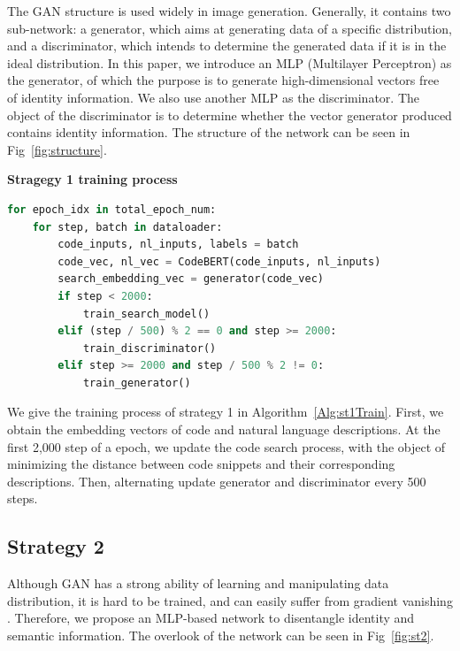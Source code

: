 The GAN structure is used widely in image generation. 
Generally, it contains two sub-network: a generator, 
which aims at generating data of a specific distribution, and a discriminator, 
which intends to determine the generated data if it is in the ideal distribution. 
In this paper, we introduce an MLP (Multilayer Perceptron) as the generator, 
of which the purpose is to generate high-dimensional vectors free of identity information. 
We also use another MLP as the discriminator. 
The object of the discriminator is to determine whether the vector generator produced 
contains identity information. The structure of the network can be seen in Fig~\ref{fig:structure}.

\begin{algorithm}[htb]
	\caption{\textbf{Stragegy 1 training process}}
	\label{Alg:st1Train}

	\begin{lstlisting}[language=Python]
for epoch_idx in total_epoch_num:
	for step, batch in dataloader:
		code_inputs, nl_inputs, labels = batch
		code_vec, nl_vec = CodeBERT(code_inputs, nl_inputs)
		search_embedding_vec = generator(code_vec)
		if step < 2000:
			train_search_model()
		elif (step / 500) % 2 == 0 and step >= 2000:         
			train_discriminator()
		elif step >= 2000 and step / 500 % 2 != 0:
			train_generator()
	\end{lstlisting}

\end{algorithm}

We give the training process of strategy 1 in Algorithm~\ref{Alg:st1Train}. 
First, we obtain the embedding vectors of code and natural language descriptions. 
At the first 2,000 step of a epoch, we update the code search process, 
with the object of minimizing the distance between code snippets and 
their corresponding descriptions. Then, alternating update generator and 
discriminator every 500 steps.


\subsection{Strategy 2}
Although GAN has a strong ability of learning and manipulating data distribution, 
it is hard to be trained, and can easily suffer from gradient vanishing \cite{wGAN}. 
Therefore, we propose an MLP-based network to disentangle identity and semantic 
information. The overlook of the network can be seen in Fig~\ref{fig:st2}. 

